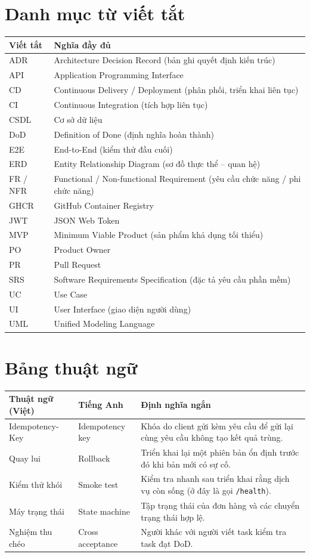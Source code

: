 \clearpage
\chapter*{Danh mục từ viết tắt}
\begin{longtable}{@{}p{3cm}p{10cm}@{}}
\toprule
\textbf{Viết tắt} & \textbf{Nghĩa đầy đủ} \\ \midrule \endhead
ADR & Architecture Decision Record (bản ghi quyết định kiến trúc) \\
API & Application Programming Interface \\
CD & Continuous Delivery / Deployment (phân phối, triển khai liên tục) \\
CI & Continuous Integration (tích hợp liên tục) \\
CSDL & Cơ sở dữ liệu \\
DoD & Definition of Done (định nghĩa hoàn thành) \\
E2E & End-to-End (kiểm thử đầu cuối) \\
ERD & Entity Relationship Diagram (sơ đồ thực thể -- quan hệ) \\
FR / NFR & Functional / Non-functional Requirement (yêu cầu chức năng / phi chức năng) \\
GHCR & GitHub Container Registry \\
JWT & JSON Web Token \\
MVP & Minimum Viable Product (sản phẩm khả dụng tối thiểu) \\
PO & Product Owner \\
PR & Pull Request \\
SRS & Software Requirements Specification (đặc tả yêu cầu phần mềm) \\
UC & Use Case \\
UI & User Interface (giao diện người dùng) \\
UML & Unified Modeling Language \\
\bottomrule
\end{longtable}

\clearpage
\chapter*{Bảng thuật ngữ}
\begin{longtable}{@{}p{3.3cm}p{3.3cm}p{6.4cm}@{}}
\toprule
\textbf{Thuật ngữ (Việt)} & \textbf{Tiếng Anh} & \textbf{Định nghĩa ngắn} \\ \midrule \endhead
Idempotency-Key & Idempotency key & Khóa do client gửi kèm yêu cầu để gửi lại cùng yêu cầu không tạo kết quả trùng. \\
Quay lui & Rollback & Triển khai lại một phiên bản ổn định trước đó khi bản mới có sự cố. \\
Kiểm thử khói & Smoke test & Kiểm tra nhanh sau triển khai rằng dịch vụ còn sống (ở đây là gọi \texttt{/health}). \\
Máy trạng thái & State machine & Tập trạng thái của đơn hàng và các chuyển trạng thái hợp lệ. \\
Nghiệm thu chéo & Cross acceptance & Người khác với người viết task kiểm tra task đạt DoD. \\
\bottomrule
\end{longtable}
